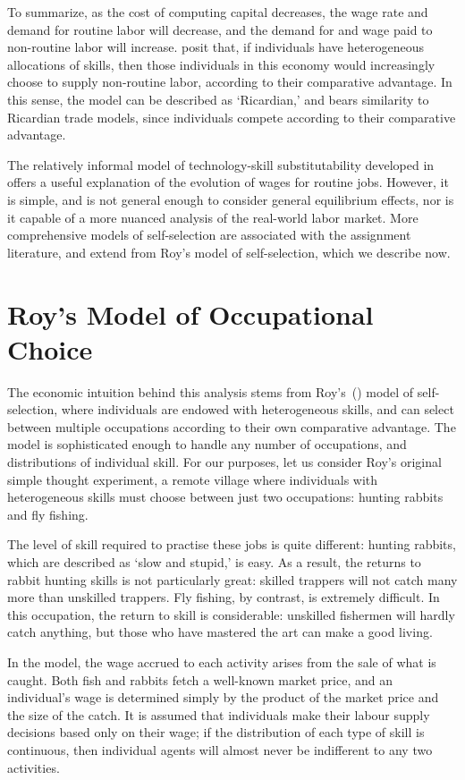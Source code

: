 To summarize, as the cost of computing capital decreases, the wage rate and demand for routine labor will decrease, and the demand for and wage paid to non-routine labor will increase. \citet{Levy2003} posit that, if individuals have heterogeneous allocations of skills, then those individuals in this economy would increasingly choose to supply non-routine labor, according to their comparative advantage. In this sense, the model can be described as `Ricardian,' and bears similarity to Ricardian trade models, since individuals compete according to their comparative advantage.

The relatively informal model of technology-skill substitutability developed in \citet{Levy2003} offers a useful explanation of the evolution of wages for routine jobs. However, it is simple, and is not general enough to consider general equilibrium effects, nor is it capable of a more nuanced analysis of the real-world labor market. More comprehensive models of self-selection are associated with the assignment literature, and extend from Roy's model of self-selection, which we describe now.

\section{Roy's Model of Occupational Choice}

The economic intuition behind this analysis stems from Roy's~(\citeyear{Roy1951}) model of self-selection, where individuals are endowed with heterogeneous skills, and can select between multiple occupations according to their own comparative advantage. The model is sophisticated enough to handle any number of occupations, and distributions of individual skill. For our purposes, let us consider Roy's original simple thought experiment, a remote village where individuals with heterogeneous skills must choose between just two occupations: hunting rabbits and fly fishing. 

The level of skill required to practise these jobs is quite different: hunting rabbits, which are described as `slow and stupid,' is easy. As a result, the returns to rabbit hunting skills is not particularly great: skilled trappers will not catch many more than unskilled trappers. Fly fishing, by contrast, is extremely difficult. In this occupation, the return to skill is considerable: unskilled fishermen will hardly catch anything, but those who have mastered the art can make a good living.

In the model, the wage accrued to each activity arises from the sale of what is caught. Both fish and rabbits fetch a well-known market price, and an individual's wage is determined simply by the product of the market price and the size of the catch. It is assumed that individuals make their labour supply decisions based only on their wage; if the distribution of each type of skill is continuous, then individual agents will almost never be indifferent to any two activities.

